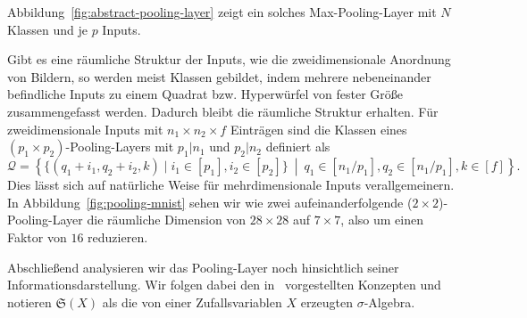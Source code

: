 \documentclass[paper=a4, 	%
		fontsize=11pt,
		abstract=true, 	%
		headsepline, 	%
		notitlepage	%
		]{scrartcl}
\theoremstyle{definition}
\newcommand{\fNat}[1]{[ #1 ]}
\newcommand{\sig}[1]{\mathfrak{S}{\left( #1 \right)}}
\begin{document}
\medskip

Abbildung~\ref{fig:abstract-pooling-layer} zeigt ein solches Max-Pooling-Layer mit $N$ Klassen und je $p$ Inputs.

Gibt es eine räumliche Struktur der Inputs, wie die zweidimensionale Anordnung von Bildern, so werden meist Klassen gebildet, indem mehrere nebeneinander befindliche Inputs zu einem Quadrat bzw. Hyperwürfel von fester Größe zusammengefasst werden.
Dadurch bleibt die räumliche Struktur erhalten.
Für zweidimensionale Inputs mit $n_1\times n_2 \times f$ Einträgen sind die Klassen eines $(p_1\times p_2)$-Pooling-Layers mit $p_1 | n_1$ und $p_2 | n_2$ definiert als
\[
    \mathcal{Q} = \left\{
        \{ (q_1 + i_1, q_2 + i_2, k) \mid i_1\in\fNat{p_1}, i_2\in\fNat{p_2} \}
        ~\middle|~
        q_1 \in \fNat{n_1 / p_1}, q_2\in \fNat{ n_1 / p_1 }, k\in\fNat{f}
        \right\}.
\]
Dies lässt sich auf natürliche Weise für mehrdimensionale Inputs verallgemeinern.
In Abbildung~\ref{fig:pooling-mnist} sehen wir wie zwei aufeinanderfolgende ($2\times 2$)-Pooling-Layer die räumliche Dimension von $28\times 28$ auf $7\times 7$, also um einen Faktor von $16$ reduzieren.


Abschließend analysieren wir das Pooling-Layer noch hinsichtlich seiner Informationsdarstellung.
Wir folgen dabei den in~\cite[Kapitel~11]{Calin2020} vorgestellten Konzepten und notieren $\sig{X}$ als die von einer Zufallsvariablen $X$ erzeugten $\sigma$-Algebra.
\end{document}
